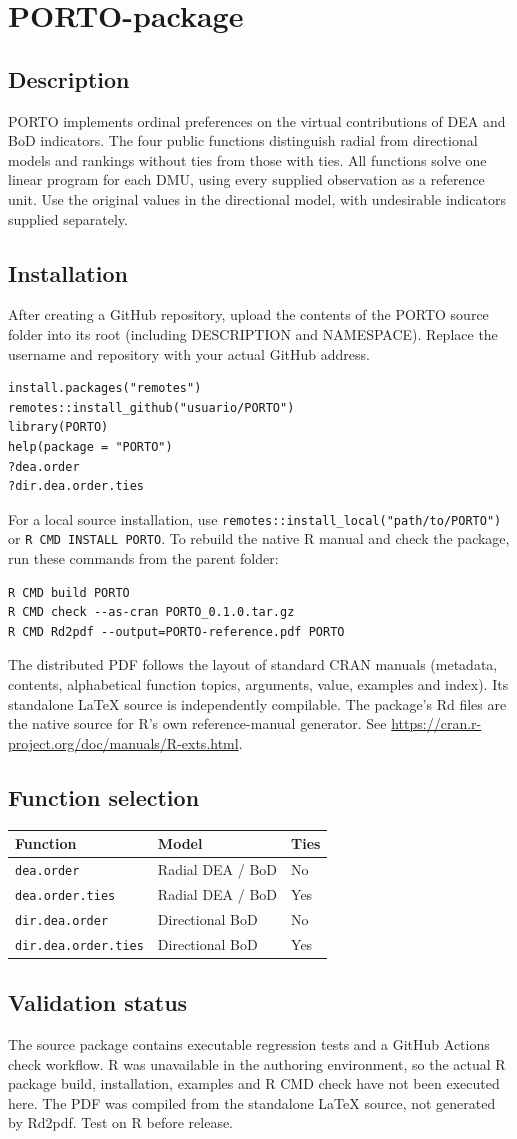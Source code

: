 \documentclass[10pt,a4paper]{article}
\newcommand{\field}[1]{\needspace{3\baselineskip}\subsection*{#1}}
\begin{document}
\section{PORTO-package}
\field{Description}
PORTO implements ordinal preferences on the virtual contributions of DEA and BoD indicators. The four public functions distinguish radial from directional models and rankings without ties from those with ties. All functions solve one linear program for each DMU, using every supplied observation as a reference unit. Use the original values in the directional model, with undesirable indicators supplied separately.
\field{Installation}
After creating a GitHub repository, upload the contents of the PORTO source folder into its root (including DESCRIPTION and NAMESPACE). Replace the username and repository with your actual GitHub address.
\begin{verbatim}
install.packages("remotes")
remotes::install_github("usuario/PORTO")
library(PORTO)
help(package = "PORTO")
?dea.order
?dir.dea.order.ties
\end{verbatim}
For a local source installation, use \texttt{remotes::install\_local("path/to/PORTO")} or \texttt{R CMD INSTALL PORTO}. To rebuild the native R manual and check the package, run these commands from the parent folder:
\begin{verbatim}
R CMD build PORTO
R CMD check --as-cran PORTO_0.1.0.tar.gz
R CMD Rd2pdf --output=PORTO-reference.pdf PORTO
\end{verbatim}
The distributed PDF follows the layout of standard CRAN manuals (metadata, contents, alphabetical function topics, arguments, value, examples and index). Its standalone LaTeX source is independently compilable. The package's Rd files are the native source for R's own reference-manual generator. See \url{https://cran.r-project.org/doc/manuals/R-exts.html}.
\field{Function selection}
\begin{tabular}{@{}lll@{}}
\toprule
Function & Model & Ties \\
\midrule
\texttt{dea.order} & Radial DEA / BoD & No \\
\texttt{dea.order.ties} & Radial DEA / BoD & Yes \\
\texttt{dir.dea.order} & Directional BoD & No \\
\texttt{dir.dea.order.ties} & Directional BoD & Yes \\
\bottomrule
\end{tabular}
\field{Validation status}
The source package contains executable regression tests and a GitHub Actions check workflow. R was unavailable in the authoring environment, so the actual R package build, installation, examples and R CMD check have not been executed here. The PDF was compiled from the standalone LaTeX source, not generated by Rd2pdf. Test on R before release.
\clearpage
\end{document}

